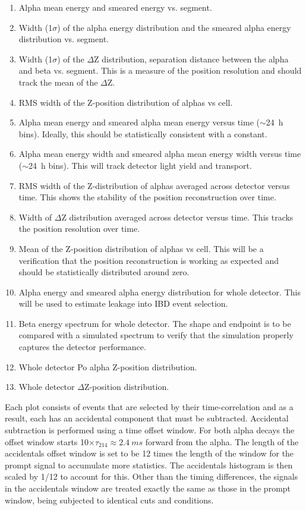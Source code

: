 \begin{enumerate}
\item{Alpha mean energy and smeared energy vs. segment.}
\item{Width (1$\sigma$) of the alpha energy distribution and the smeared alpha energy distribution vs. segment.}
\item{Width (1$\sigma$) of the $\Delta$Z distribution, separation distance between the alpha and beta vs. segment. This is a measure of the position resolution and should track the mean of the $\Delta$Z.}
\item{RMS width of the Z-position distribution of alphas vs cell.}
\item{Alpha mean energy and smeared alpha mean energy versus time ($\sim$24~h bins). Ideally, this should be statistically consistent with a constant.}
\item{Alpha mean energy width  and smeared alpha mean energy width versus time ($\sim$24~h bins). This will track detector light yield and transport.}
\item{RMS width of the Z-distribution of alphas averaged across detector versus time. This shows the stability of the position reconstruction over time.}
\item{Width of $\Delta$Z distribution averaged across detector versus time. This tracks the position resolution over time.}
\item{Mean of the Z-position distribution of alphas vs cell. This will be a verification that the position reconstruction is working as expected and should be statistically distributed around zero.}
\item{Alpha energy and smeared alpha energy distribution for whole detector. This will be used to estimate leakage into IBD event selection.}
\item{Beta energy spectrum for whole detector. The shape and endpoint is to be compared with a simulated spectrum to verify that the simulation properly captures the detector performance. }
\item{Whole detector Po alpha Z-position distribution.}
\item{Whole detector $\Delta$Z-position distribution.}
\end{enumerate}
Each plot consists of events that are selected by their time-correlation and as a result, each has an accidental component that must be subtracted. Accidental subtraction is performed using a time offset window. For both alpha decays the offset window starts 10$\times\tau_{214}\approx2.4~ms$ forward from the alpha. The length of the accidentals offset window is set to be 12 times the length of the window for the prompt signal to accumulate more statistics. The accidentals histogram is then scaled by 1/12 to account for this. Other than the timing differences, the signals in the accidentals window are treated exactly the same as those in the prompt window, being subjected to identical cuts and conditions.


